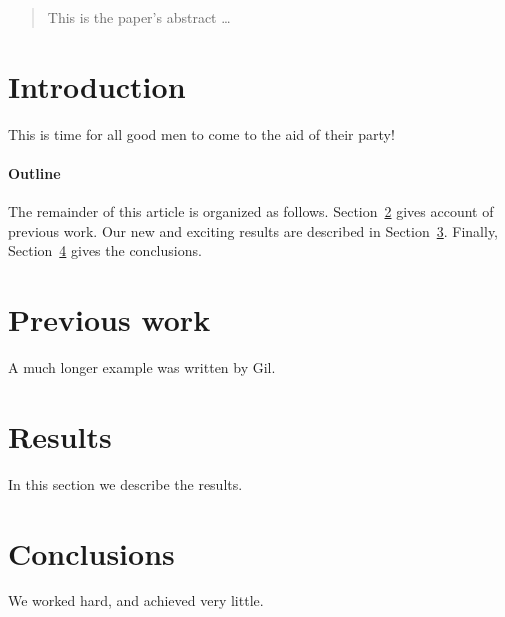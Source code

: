 \documentclass[12pt]{article}
\begin{document}
\maketitle

\begin{abstract}
This is the paper's abstract \ldots
\end{abstract}

\section{Introduction}
This is time for all good men to come to the aid of their party!

\paragraph{Outline}
The remainder of this article is organized as follows.
Section~\ref{previous work} gives account of previous work.
Our new and exciting results are described in Section~\ref{results}.
Finally, Section~\ref{conclusions} gives the conclusions.

\section{Previous work}\label{previous work}
A much longer \LaTeXe{} example was written by Gil.

\section{Results}\label{results}
In this section we describe the results.

\section{Conclusions}\label{conclusions}
We worked hard, and achieved very little.
\end{document}
